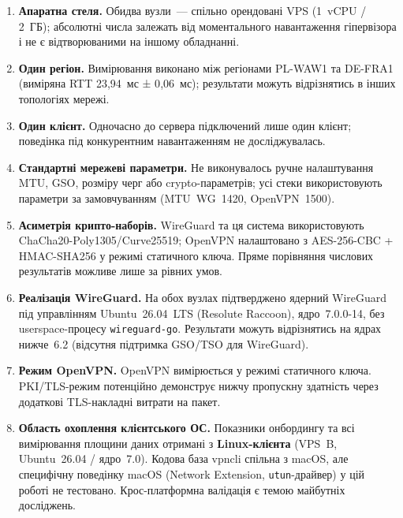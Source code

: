 \begin{enumerate}
  \item \textbf{Апаратна стеля.} Обидва вузли~--- спільно орендовані VPS
        (1~vCPU / 2~ГБ); абсолютні числа залежать від моментального
        навантаження гіпервізора і не є відтворюваними на іншому обладнанні.

  \item \textbf{Один регіон.} Вимірювання виконано між регіонами PL-WAW1 та
        DE-FRA1 (виміряна RTT 23{,}94~мс ± 0{,}06~мс); результати можуть
        відрізнятись в інших топологіях мережі.

  \item \textbf{Один клієнт.} Одночасно до сервера підключений лише один
        клієнт; поведінка під конкурентним навантаженням не досліджувалась.

  \item \textbf{Стандартні мережеві параметри.} Не виконувалось ручне
        налаштування MTU, GSO, розміру черг або crypto-параметрів; усі
        стеки використовують параметри за замовчуванням (MTU~WG~1420,
        OpenVPN~1500).

  \item \textbf{Асиметрія крипто-наборів.} WireGuard та ця система
        використовують ChaCha20-Poly1305/Curve25519; OpenVPN налаштовано з
        AES-256-CBC + HMAC-SHA256 у режимі статичного ключа. Пряме порівняння
        числових результатів можливе лише за рівних умов.

  \item \textbf{Реалізація WireGuard.} На обох вузлах підтверджено ядерний
        WireGuard під управлінням Ubuntu~26.04~LTS (Resolute Raccoon),
        ядро~7.0.0-14, без userspace-процесу \texttt{wireguard-go}. Результати
        можуть відрізнятись на ядрах нижче~6.2 (відсутня підтримка GSO/TSO
        для WireGuard).

  \item \textbf{Режим OpenVPN.} OpenVPN вимірюється у режимі статичного
        ключа. PKI/TLS-режим потенційно демонструє нижчу пропускну здатність
        через додаткові TLS-накладні витрати на пакет.

  \item \textbf{Область охоплення клієнтського ОС.} Показники
        онбордингу та всі вимірювання площини даних отримані з
        \textbf{Linux-клієнта} (VPS~B, Ubuntu~26.04 / ядро~7.0). Кодова
        база vpncli спільна з macOS, але специфічну поведінку macOS
        (Network Extension, \texttt{utun}-драйвер) у цій роботі не
        тестовано. Крос-платформна валідація є темою майбутніх досліджень.
\end{enumerate}

